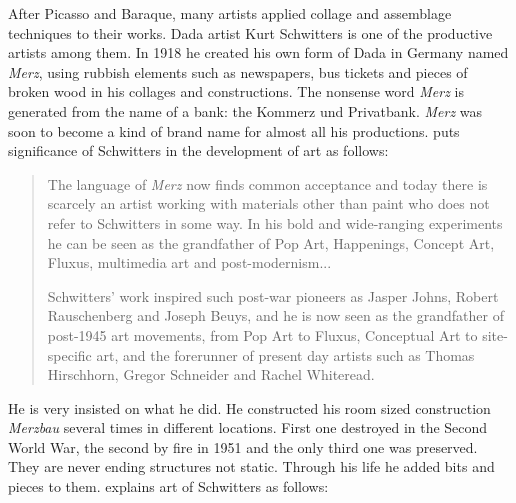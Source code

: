 After Picasso and Baraque, many artists applied collage and assemblage techniques to their works. Dada artist Kurt Schwitters is one of the productive artists among them. In 1918 he created his own form of Dada in Germany named \textit{Merz}, using rubbish elements such as newspapers, bus tickets and pieces of broken wood in his collages and constructions. The nonsense word \textit{Merz} is generated from the name of a bank: the Kommerz und Privatbank. \textit{Merz} was soon to become a kind of brand name for almost all his productions. \cite{webster2011kurt} puts significance of Schwitters in the development of art as follows:

\begin{quote}
The language of \textit{Merz} now finds common acceptance and today there is scarcely an artist working with materials other than paint who does not refer to Schwitters in some way. In his bold and wide-ranging experiments he can be seen as the grandfather of Pop Art, Happenings, Concept Art, Fluxus, multimedia art and post-modernism...

Schwitters’ work inspired such post-war pioneers as Jasper Johns, Robert Rauschenberg and Joseph Beuys, and he is now seen as the grandfather of post-1945 art movements, from Pop Art to Fluxus, Conceptual Art to site-specific art, and the forerunner of present day artists such as Thomas Hirschhorn, Gregor Schneider and Rachel Whiteread.
\end{quote}

He is very insisted on what he did. He constructed his room sized construction \textit{Merzbau} several times in different locations. First one destroyed in the Second World War, the second by fire in 1951 and the only third one was preserved. They are never ending structures not static. Through his life he added bits and pieces to them. \cite{carroll2011ruin} explains art of Schwitters as follows:

